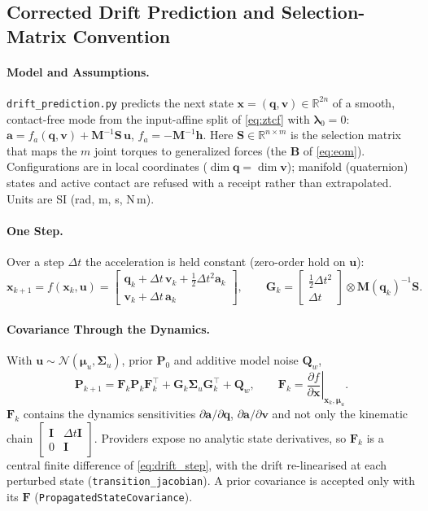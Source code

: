 \documentclass[11pt,a4paper]{article}
\newcommand{\R}{\mathbb{R}}
\newcommand{\bq}{\mathbf{q}}
\newcommand{\bv}{\mathbf{v}}
\newcommand{\ba}{\mathbf{a}}
\newcommand{\bu}{\mathbf{u}}
\newcommand{\bx}{\mathbf{x}}
\newcommand{\bh}{\mathbf{h}}
\newcommand{\bM}{\mathbf{M}}
\newcommand{\bB}{\mathbf{B}}
\newcommand{\bP}{\mathbf{P}}
\newcommand{\bS}{\mathbf{S}}
\newcommand{\blambda}{\boldsymbol{\lambda}}
\begin{document}
\subsection{Corrected Drift Prediction and Selection-Matrix Convention}
\label{sec:drift_prediction}
\paragraph{Model and Assumptions.}  \texttt{drift\_prediction.py} predicts the
next state $\bx=(\bq,\bv)\in\R^{2n}$ of a smooth, contact-free mode from the
input-affine split of \eqref{eq:ztcf} with $\blambda_0=0$:
$\ba=f_a(\bq,\bv)+\bM^{-1}\bS\,\bu$, $f_a=-\bM^{-1}\bh$.  Here $\bS\in\R^{n\times m}$
is the selection matrix that maps the $m$ joint torques to generalized
forces (the $\bB$ of \eqref{eq:eom}).  Configurations are in local
coordinates ($\dim\bq=\dim\bv$); manifold (quaternion) states and active
contact are refused with a receipt rather than extrapolated.  Units are SI
(rad, m, s, N\,m).

\paragraph{One Step.}  Over a step $\Delta t$ the acceleration is held constant
(zero-order hold on $\bu$):
\begin{equation}
  \bx_{k+1}=f(\bx_k,\bu)=
  \begin{bmatrix}\bq_k+\Delta t\,\bv_k+\tfrac12\Delta t^2\ba_k\\
                 \bv_k+\Delta t\,\ba_k\end{bmatrix},\qquad
  \mathbf{G}_k=\begin{bmatrix}\tfrac12\Delta t^2\\ \Delta t\end{bmatrix}\otimes\bM(\bq_k)^{-1}\bS .
  \label{eq:drift_step}
\end{equation}

\paragraph{Covariance Through the Dynamics.}  With $\bu\sim\mathcal N(\boldsymbol\mu_u,\boldsymbol\Sigma_u)$,
prior $\bP_0$ and additive model noise $\mathbf Q_w$,
\begin{equation}
  \bP_{k+1}=\mathbf F_k\bP_k\mathbf F_k^{\!\top}+\mathbf G_k\boldsymbol\Sigma_u\mathbf G_k^{\!\top}+\mathbf Q_w,
  \qquad \mathbf F_k=\left.\frac{\partial f}{\partial\bx}\right|_{\bx_k,\boldsymbol\mu_u}.
  \label{eq:drift_cov}
\end{equation}
$\mathbf F_k$ contains the dynamics sensitivities
$\partial\ba/\partial\bq$, $\partial\ba/\partial\bv$ and not only the kinematic
chain $\left[\begin{smallmatrix}\mathbf I&\Delta t\mathbf I\\0&\mathbf I\end{smallmatrix}\right]$.
Providers expose no analytic state derivatives, so $\mathbf F_k$ is a central
finite difference of \eqref{eq:drift_step}, with the drift re-linearised at each
perturbed state (\texttt{transition\_jacobian}).  A prior covariance is accepted
only with its $\mathbf F$ (\texttt{PropagatedStateCovariance}).
\end{document}
